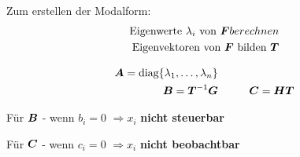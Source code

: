 \begin{tcolorbox}[colback=white!10!white,colframe=blue!70!black,title=KOCHREZEPT: Modalform]
    
    \tcblower
    Zum erstellen der Modalform:
    \begin{align}
        \text{Eigenwerte } \lambda_i \text{ von } \boldsymbol{F} berechnen\\
        \text{Eigenvektoren von } \boldsymbol{F} \text{ bilden } \boldsymbol{T}
    \end{align}
        \begin{tcolorbox}[colback=white!10!white,colframe=blue!70!black,title=Umrechnungsvorschrift in Modalform]
            \begin{align*}
            \boldsymbol{A} = \text{diag}\{\lambda_1,\dots,\lambda_n\} &
             \\
            \boldsymbol{B} = \boldsymbol{T}^{-1}\boldsymbol{G} 
            &
            \hspace{1cm}\boldsymbol{C} = \boldsymbol{HT}
            \end{align*}
        \end{tcolorbox}

    \begin{tcolorbox}[colback=white!10!white,colframe=gray!70!black,title=Aussagen]
        Für $\boldsymbol{B}$ - wenn $b_i = 0$ $\Rightarrow x_i$ \textbf{nicht steuerbar}
        
        Für $\boldsymbol{C}$ - wenn $c_i = 0$ $\Rightarrow x_i$ \textbf{nicht beobachtbar}
        
        
        
    \end{tcolorbox}        
        
    
\end{tcolorbox}


